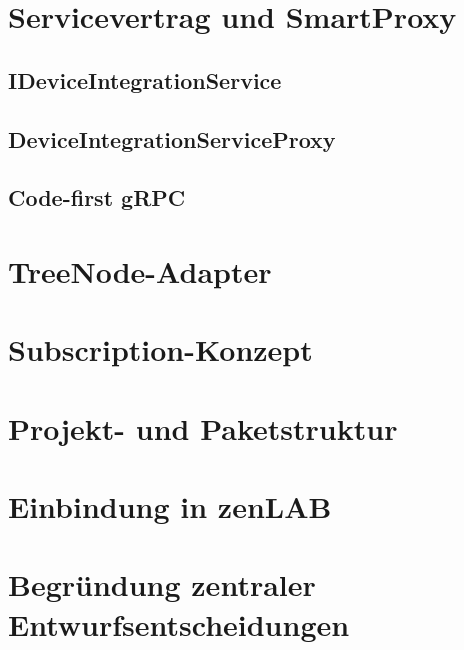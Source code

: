 \section{Servicevertrag und SmartProxy}
\subsection{IDeviceIntegrationService}
\subsection{DeviceIntegrationServiceProxy}
\subsection{Code-first gRPC}
\section{TreeNode-Adapter}
\section{Subscription-Konzept}
\section{Projekt- und Paketstruktur}
\section{Einbindung in zenLAB}
\section{Begründung zentraler Entwurfsentscheidungen}
